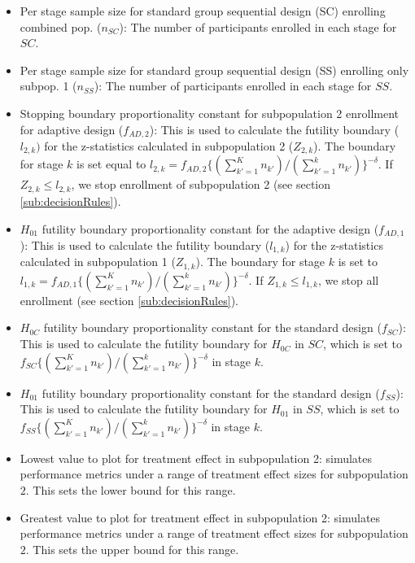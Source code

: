 \documentclass[article]{jss}
\begin{document}
\begin{itemize}
\item Per stage sample size for standard group sequential design (SC) enrolling combined pop. ($n_{SC}$): The number of participants enrolled in each stage for $SC$.

\item Per stage sample size for standard group sequential design (SS) enrolling only subpop. 1 ($n_{SS}$): The number of participants enrolled in each stage for $SS$.

\item Stopping boundary proportionality constant for subpopulation 2 enrollment for adaptive design ($f_{AD,2}$): This is used to calculate the futility boundary ($l_{2,k})$ for the z-statistics calculated in subpopulation 2 ($Z_{2,k}$). The boundary for stage $k$ is set equal to $l_{2,k}=f_{AD,2}\{(\sum_{k'=1}^{K} n_{k'})/(\sum_{k'=1}^{k}n_{k'})\}^{-δ}$. If $Z_{2,k}\leq l_{2,k}$, we stop enrollment of subpopulation 2 (see section \ref{sub:decisionRules}).

\item $H_{01}$ futility boundary proportionality constant for the adaptive design ($f_{AD,1}$):  This is used to calculate the futility boundary ($l_{1,k}$) for the z-statistics calculated in subpopulation 1 ($Z_{1,k}$). The boundary for stage $k$ is set to  $l_{1,k}=f_{AD,1}\{(\sum_{k'=1}^{K} n_{k'})/(\sum_{k'=1}^{k}n_{k'})\}^{-δ}$.  If $Z_{1,k}\leq l_{1,k}$, we stop all enrollment (see section \ref{sub:decisionRules}).

\item $H_{0C}$ futility boundary proportionality constant for the standard design ($f_{SC}$): This is used to calculate the futility boundary for $H_{0C}$ in $SC$, which is set to $f_{SC}\{(\sum_{k'=1}^{K} n_{k'})/(\sum_{k'=1}^{k}n_{k'})\}^{-δ}$ in stage $k$.

\item $H_{01}$ futility boundary proportionality constant for the standard design ($f_{SS}$):  This is used to calculate the futility boundary for $H_{01}$ in $SS$, which is set to $f_{SS}\{(\sum_{k'=1}^{K} n_{k'})/(\sum_{k'=1}^{k}n_{k'})\}^{-δ}$ in stage $k$.


\item Lowest value to plot for treatment effect in subpopulation 2:  simulates performance metrics under a range of treatment effect sizes for subpopulation $2$. This sets the lower bound for this range.

\item Greatest value to plot for treatment effect in subpopulation 2:  simulates performance metrics under a range of treatment effect sizes for subpopulation $2$. This sets the upper bound for this range.


\end{itemize}
\end{document}
